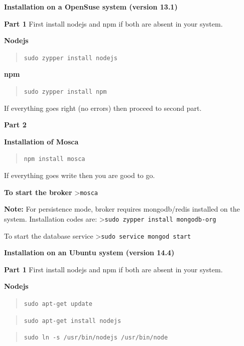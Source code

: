 \documentclass[16pt]{article}
\begin{document}
\textbf{Installation on a OpenSuse system (version
13.1)}

\textbf{Part 1} First install nodejs and npm if both are absent in your
system.

 
\textbf{Nodejs}

\begin{quote}
\texttt{sudo zypper install nodejs}
\end{quote}

\textbf{npm}

\begin{quote}
\texttt{sudo zypper install npm}
\end{quote}

If everything goes right (no errors) then proceed to second part.
 \vspace{0.5cm}

\textbf{Part 2}

\textbf{Installation of Mosca}

\begin{quote}
\texttt{npm install mosca}
\end{quote}

If everything goes write then you are good to go.
 \vspace{0.5cm}

\textbf{To start the broker} \textgreater{}\texttt{mosca}

\textbf{Note:} For persistence mode, broker requires mongodb/redis
installed on the system. Installation codes are:
\textgreater{}\texttt{sudo zypper install mongodb-org}

To start the database service
\textgreater{}\texttt{sudo service mongod start}
 \vspace{0.5cm}



\textbf{Installation on an Ubuntu system (version
14.4)}

\textbf{Part 1} First install nodejs and npm if both are absent in your
system.

\textbf{Nodejs}

\begin{quote}
\texttt{sudo apt-get update}
\end{quote}

\begin{quote}
\texttt{sudo apt-get install nodejs}
\end{quote}

\begin{quote}
\texttt{sudo ln -s /usr/bin/nodejs /usr/bin/node}
\end{quote}
\end{document}
